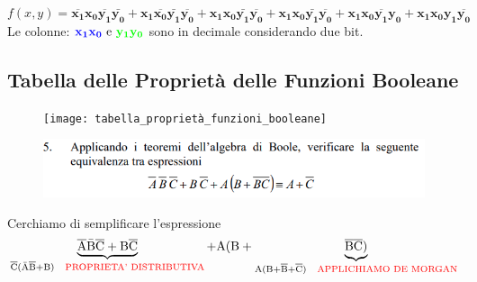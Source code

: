 
$ f(x,y) = \mathbf{\overline{x_1}x_0\overline{y_1}\bar{y_0}} + \mathbf{x_1\overline{x_0}\bar{y_1}\overline{y_0}} + \mathbf{x_1 x_0 \bar{y_1}\overline{y_0}} + \mathbf{x_1 x_0 \bar{y_1} \overline{y_0}} + \mathbf{x_1 x_0 \overline{y_1} y_0} + \mathbf{x_1 x_0 y_1 \overline{y_0}}$ \\

\textsf{{\small Le colonne: $ \mathbf{\color{blue} x_1 x_0} \text{ e } \mathbf{\color{green}y_1 y_0 }$ sono in decimale considerando due bit.}} \\


\subsection{Tabella delle Proprietà delle Funzioni Booleane}

\begin{figure}[ht]
	\centering
	\texttt{[image: tabella\_proprietà\_funzioni\_booleane]}
	\label{fig:tabella_proprietà_funzioni_booleane}
\end{figure}


\newpage

\begin{figure}[ht]
	\includegraphics[width=1\linewidth]{es5_pag11_AlgebraDiBoole}
	\label{fig:es5pag11algebradiboole}
\end{figure}

\textsf{{\small Cerchiamo di semplificare l'espressione}} \\
 
\begin{equation*}
	\underbrace{\overline{\text{A}}\bar{\text{B}}\overline{\text{C}} + \text{B}\overline{\text{C}}} _{\overline{\text{C}}(\bar{\text{A}}\overline{\text{B}} + \text{B}) \hspace{0.3cm}\textrm{\color{red}PROPRIETA' DISTRIBUTIVA}} + 
	\text{A}(\text{B} + \underbrace{\overline{\text{B}}\overline{\text{C}})} 
	_{\text{A}(\text{B} + \overline{\text{B}} + \overline{\text{C}}) \hspace{0.3cm}\textrm{\color{red} APPLICHIAMO DE MORGAN}}
\end{equation*}

